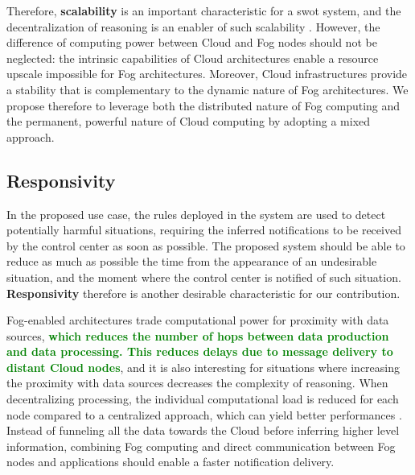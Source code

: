 \documentclass{iosart2c}
\newcommand{\added}[1]{\textcolor{green}{\textbf{#1}}}
\begin{document}
Therefore, \textbf{scalability} is an important characteristic for a \gls{swot} system, and the decentralization of reasoning is an enabler of such scalability \cite{Maarala2017}.
However, the difference of computing power between Cloud and Fog nodes should not be neglected: the intrinsic capabilities of Cloud architectures enable a resource upscale impossible for Fog architectures.
Moreover, Cloud infrastructures provide a stability that is complementary to the dynamic nature of Fog architectures.
We propose therefore to leverage both the distributed nature of Fog computing and the permanent, powerful nature of Cloud computing by adopting a mixed approach. 

\subsection{Responsivity}

In the proposed use case, the rules deployed in the system are used to detect potentially harmful situations, requiring the inferred notifications to be received by the control center as soon as possible. 
The proposed system should be able to reduce as much as possible the time from the appearance of an undesirable situation, and the moment where the control center is notified of such situation.
\textbf{Responsivity} therefore is another desirable characteristic for our contribution.

Fog-enabled architectures trade computational power for proximity with data sources, \added{which reduces the number of hops between data production and data processing. 
This reduces delays due to message delivery to distant Cloud nodes}, and it is also interesting for situations where increasing the proximity with data sources decreases the complexity of reasoning.
When decentralizing processing, the individual computational load is reduced for each node compared to a centralized approach, which can yield better performances \cite{Su2018}.
Instead of funneling all the data towards the Cloud before inferring higher level information, combining Fog computing and direct communication between Fog nodes and applications should enable a faster notification delivery.
\end{document}
